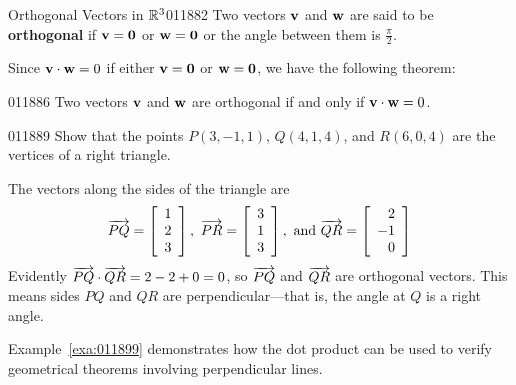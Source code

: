 \begin{definition}{Orthogonal Vectors in $\mathbb{R}^3$}{011882}
Two vectors $\textbf{v}$ and $\textbf{w}$ are said to be \textbf{orthogonal} if $\textbf{v} = \textbf{0}$ or $\textbf{w} = \textbf{0}$ or the angle between them is $\frac{\pi}{2}$.
\end{definition}

\noindent Since $\textbf{v} \cdot \textbf{w} = 0$ if either $\textbf{v} = \textbf{0}$ or $\textbf{w} = \textbf{0}$, we have the following theorem:


\begin{theorem}{}{011886}
Two vectors $\textbf{v}$ and $\textbf{w}$ are orthogonal if and only if $\textbf{v} \cdot \textbf{w} = 0$.
\end{theorem}

\begin{example}{}{011889}
Show that the points $P(3, -1, 1)$, $Q(4, 1, 4)$, and $R(6, 0, 4)$ are the vertices of a right triangle.


\begin{solution}
  The vectors along the sides of the triangle are
\begin{equation*}
\overrightarrow{PQ} = \left[
\begin{array}{r}
1 \\
2 \\
3
\end{array}
\right],\
\overrightarrow{PR} = \left[
\begin{array}{r}
3 \\
1 \\
3
\end{array}
\right], \mbox{ and }
\overrightarrow{QR} = \left[
\begin{array}{r}
2 \\
-1 \\
0
\end{array}
\right]
\end{equation*}
Evidently $\overrightarrow{PQ} \cdot \overrightarrow{QR} = 2 - 2 + 0 = 0$, so $\overrightarrow{PQ}$ and $\overrightarrow{QR}$ are orthogonal vectors. This means sides $PQ$ and $QR$ are perpendicular---that is, the angle at $Q$ is a right angle.
\end{solution}
\end{example}

Example~\ref{exa:011899} demonstrates how the dot product can be used to verify geometrical theorems involving perpendicular lines.


